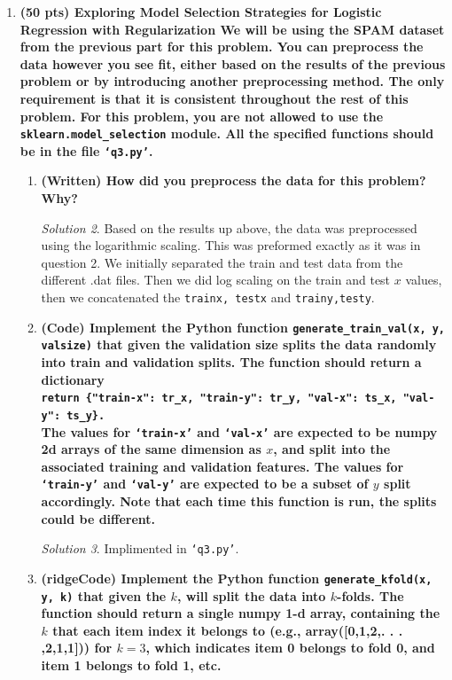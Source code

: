 \documentclass[a4paper,12pt]{article}
\theoremstyle{definition}
\theoremstyle{remark}
\newtheorem*{solution}{Solution}
\begin{document}
\begin{enumerate}
\begin{enumerate}
\begin{solution}
			\end{solution}
		\end{enumerate}
		\item {\bf (50 pts) Exploring Model Selection Strategies for Logistic Regression with Regularization
			We will be using the SPAM dataset from the previous part for this problem. You can preprocess the data
			however you see fit, either based on the results of the previous problem or by introducing another
			preprocessing method. The only requirement is that it is consistent throughout the rest of this problem.
			For this problem, you are not allowed to use the \texttt{sklearn.model\_selection} module. All the specified functions should be in the file \texttt{‘q3.py’}.}
	
		\begin{enumerate}
			\item {\bf (Written) How did you preprocess the data for this problem? Why?}
			\begin{solution}
				Based on the results up above, the data was preprocessed using the logarithmic scaling. This was preformed exactly as it was in question 2. We initially separated the train and test data from the different .dat files. Then we did log scaling on the train and test $x$ values, then we concatenated the \texttt{trainx, testx} and \texttt{trainy,testy}.
			\end{solution}
			\item {\bf (Code) Implement the Python function \texttt{generate\_train\_val(x, y, valsize)} that given the validation size splits the data randomly into train and validation splits. The function should return a dictionary \\
				\texttt{return \{"train-x": tr\_x, "train-y": tr\_y, "val-x": ts\_x, "val-y": ts\_y\}.}\\ 
				The values for \texttt{‘train-x’} and \texttt{‘val-x’} are expected to be numpy 2d arrays of the same dimension as $x$, and split into the associated training and validation features. The values for \texttt{‘train-y’} and \texttt{‘val-y’} are expected to be a subset
				of $y$ split accordingly. Note that each time this function is run, the splits could be different.}
			\begin{solution}
				Implimented in \texttt{`q3.py'}.
			\end{solution}
			\item {\bf (ridgeCode) Implement the Python function \texttt{generate\_kfold(x, y, k)} that given the $k$, will split the data into $k$-folds. The function should return a single numpy 1-d array, containing the $k$ that each item index it belongs to (e.g., array([0,1,2,. . . ,2,1,1])) for $k=3$, which indicates item 0 belongs to fold 0, and item 1 belongs to fold 1, etc.}

\end{enumerate}
\end{enumerate}
\end{document}

